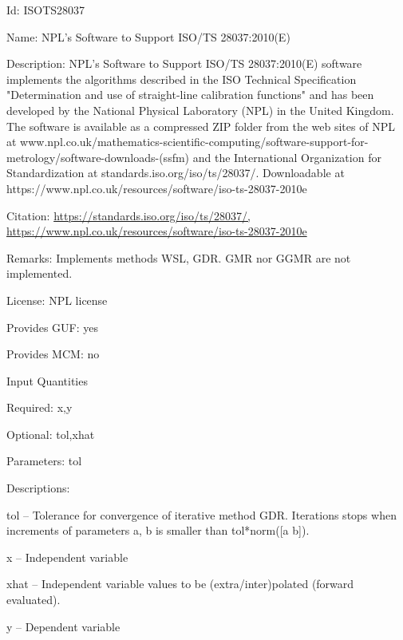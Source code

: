 \begin{tightdesc}
\item [Id:] ISOTS28037
\item [Name:] NPL’s Software to Support ISO/TS 28037:2010(E)
\item [Description:] NPL’s Software to Support ISO/TS 28037:2010(E) software implements the algorithms described in the ISO Technical Specification "Determination and use of straight-line calibration functions" and has been developed by the National Physical Laboratory (NPL) in the United Kingdom. The software is available as a compressed ZIP folder from the web sites of NPL at www.npl.co.uk/mathematics-scientific-computing/software-support-for-metrology/software-downloads-(ssfm) and the International Organization for Standardization at standards.iso.org/iso/ts/28037/. Downloadable at https://www.npl.co.uk/resources/software/iso-ts-28037-2010e
\item [Citation:] \url{https://standards.iso.org/iso/ts/28037/,} \url{https://www.npl.co.uk/resources/software/iso-ts-28037-2010e}
\item [Remarks:] Implements methods WSL, GDR. GMR nor GGMR are not implemented.
\item [License:] NPL license
\item [Provides GUF:] yes
\item [Provides MCM:] no
\item [Input Quantities] \rule{0em}{0em}
    \begin{tightdesc}
    \item [Required:] 
        \textsf{x},\enspace \textsf{y}
    \item [Optional:] 
        \textsf{tol},\enspace \textsf{xhat}
    \item [Parameters:] 
        \textsf{tol}
    \item [Descriptions:] \rule{0em}{0em}
        \begin{tightdesc}
            \item[\textsf{tol}] -- Tolerance for convergence of iterative method GDR. Iterations stops when increments of parameters a, b is smaller than tol*norm([a b]).
            \item[\textsf{x}] -- Independent variable
            \item[\textsf{xhat}] -- Independent variable values to be (extra/inter)polated (forward evaluated).
            \item[\textsf{y}] -- Dependent variable
        \end{tightdesc}

\end{tightdesc}
\end{tightdesc}
